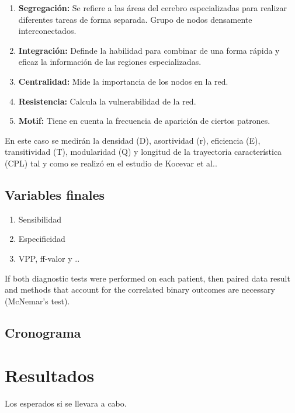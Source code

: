 \documentclass[fleqn,12pt]{UICArticle} %
\begin{document}
\begin{enumerate}[noitemsep]
\item \textbf{Segregación:} Se refiere a las áreas del cerebro especializadas para realizar diferentes tareas de forma separada. Grupo de nodos densamente interconectados.
\item \textbf{Integración:} Definde la habilidad para combinar de una forma rápida y eficaz la información de las regiones especializadas.
\item \textbf{Centralidad:} Mide la importancia de los nodos en la red.
\item \textbf{Resistencia:} Calcula la vulnerabilidad de la red.
\item \textbf{Motif:} Tiene en cuenta la frecuencia de aparición de ciertos patrones.
\end{enumerate}

En este caso se medirán la densidad (D), asortividad (r), eficiencia (E), transitividad (T), modularidad (Q) y longitud de la trayectoria característica (CPL) tal y como se realizó en el estudio de Kocevar et al.\cite{Kocevar2016}.

\subsection{Variables finales}


\begin{enumerate}[noitemsep]
\item Sensibilidad
\item Especificidad
\item VPP, ff-valor y ..
\end{enumerate}

If both diagnostic tests were performed on each patient, then paired data result and methods that account for the correlated binary outcomes are necessary (McNemar's test).


\subsection{Cronograma}

\section{Resultados}
Los esperados si se llevara a cabo.

\end{document}
